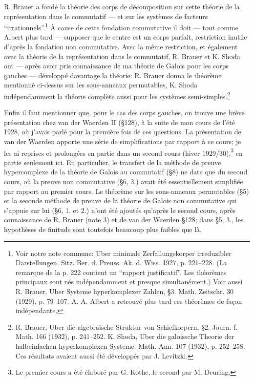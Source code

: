 R. Brauer a fondé la théorie des corps de décomposition sur cette théorie de la représentation dans le commutatif --- et sur les systèmes de facteurs ``irrationnels''.\footnote{Voir notre note commune: Uber minimale Zerfallungskorper irreduzibler Darstellungen. Sitz. Ber. d. Preuss. Ak. d. Wiss. 1927, p. 221--228. (La remarque de la p. 222 contient un ``rapport justificatif''. Les théorèmes principaux sont nés indépendamment et presque simultanément.) Voir aussi R. Brauer, Uber Systeme hyperkomplexer Zahlen, \S 3. Math. Zeitschr. 30 (1929), p. 79--107. A. A. Albert a retrouvé plus tard ces théorèmes de façon indépendante.} À cause de cette fondation commutative il doit --- tout comme Albert plus tard --- supposer que le centre est un corps parfait, restriction inutile d'après la fondation non commutative. Avec la même restriction, et également avec la théorie de la représentation dans le commutatif, R. Brauer et K. Shoda ont --- après avoir pris connaissance de ma théorie de Galois pour les corps gauches --- développé davantage la théorie: R. Brauer donna le théorème mentionné ci-dessus sur les sous-anneaux permutables, K. Shoda indépendamment la théorie complète aussi pour les systèmes semi-simples.\footnote{R. Brauer, Uber die algebraische Struktur von Schiefkorpern, \S 2. Journ. f. Math. 166 (1932), p. 241--252. K. Shoda, Uber die galoissche Theorie der halbeinfachen hyperkomplexen Systeme. Math. Ann. 107 (1932), p. 252--258. Ces résultats avaient aussi été développés par J. Levitzki.}

Enfin il faut mentionner que, pour le cas des corps gauches, on trouve une brève présentation chez van der Waerden II (\S 128), à la suite de mon cours de l'été 1928, où j'avais parlé pour la première fois de ces questions. La présentation de van der Waerden apporte une série de simplifications par rapport à ce cours; je les ai reprises et prolongées en partie dans un second cours (hiver 1929/30),\footnote{Le premier cours a été élaboré par G. Kothe, le second par M. Deuring.} en partie seulement ici. En particulier, le transfert de la méthode de preuve hypercomplexe de la théorie de Galois au commutatif (\S 8) ne date que du second cours, où la preuve non commutative (\S 6, 3.) avait été essentiellement simplifiée par rapport au premier cours. Le théorème sur les sous-anneaux permutables (\S 5) et la seconde méthode de preuve de la théorie de Galois non commutative qui s'appuie sur lui (\S 6, 1. et 2.) n'ont été ajoutés qu'après le second cours, après connaissance de R. Brauer (note 3) et de van der Waerden \S 128; dans \S 5, 3., les hypothèses de finitude sont toutefois beaucoup plus faibles que là.

